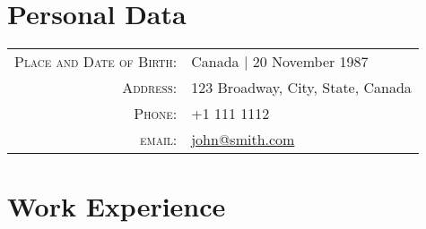 \documentclass[a4paper,10pt]{article} %
\begin{document}
\pagestyle{empty} %


\par{\bigskip\par} %

\section{Personal Data}

\begin{tabular}{rl}
\textsc{Place and Date of Birth:} & Canada  | 20 November 1987 \\
\textsc{Address:} & 123 Broadway, City, State, Canada \\
\textsc{Phone:} & +1 111 1112\\
\textsc{email:} & \href{mailto:john@smith.com}{john@smith.com}
\end{tabular}


\section{Work Experience}
\end{document}
